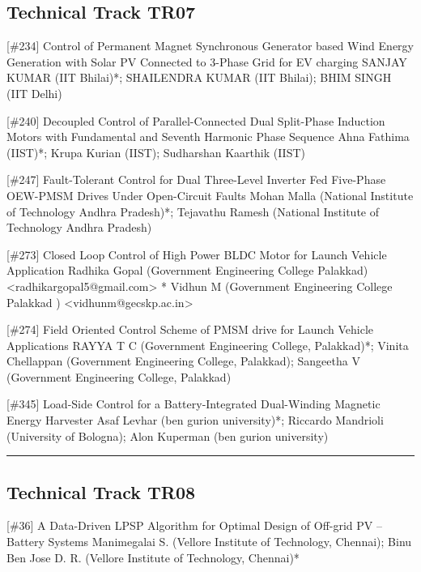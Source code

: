 \subsection{Technical Track TR07}\nopagebreak {} \begin{abstract_online} {[\#234] Control of Permanent Magnet Synchronous Generator based Wind Energy Generation with Solar PV Connected to 3-Phase Grid for EV charging} {} {SANJAY KUMAR (IIT Bhilai)*; SHAILENDRA  KUMAR (IIT Bhilai); BHIM SINGH (IIT Delhi)} {}  \end{abstract_online} 
{} \begin{abstract_online} {[\#240] Decoupled Control of Parallel-Connected Dual Split-Phase Induction Motors with Fundamental and Seventh Harmonic Phase Sequence} {} {Ahna Fathima (IIST)*; Krupa Kurian (IIST); Sudharshan Kaarthik (IIST)} {}  \end{abstract_online} 
{} \begin{abstract_online} {[\#247] Fault-Tolerant Control for Dual Three-Level Inverter Fed Five-Phase OEW-PMSM Drives Under Open-Circuit Faults } {} {Mohan Malla (National Institute of Technology Andhra Pradesh)*; Tejavathu  Ramesh (National Institute of Technology Andhra Pradesh)} {}  \end{abstract_online} 
 {} \begin{abstract_online} {[\#273] Closed Loop Control of High Power BLDC Motor  for Launch Vehicle Application} {} {Radhika Gopal (Government Engineering College Palakkad) <radhikargopal5@gmail.com> *
		Vidhun M (Government Engineering College Palakkad ) <vidhunm@gecskp.ac.in> } {}  \end{abstract_online}  
{} \begin{abstract_online} {[\#274] Field Oriented Control Scheme of PMSM drive for Launch Vehicle Applications} {} {RAYYA  T C (Government Engineering College, Palakkad)*; Vinita  Chellappan (Government Engineering College, Palakkad); Sangeetha V (Government Engineering College, Palakkad)} {}  \end{abstract_online} 
{} \begin{abstract_online} {[\#345] Load-Side Control for a Battery-Integrated Dual-Winding Magnetic Energy Harvester  } {} {Asaf Levhar (ben gurion university)*; Riccardo Mandrioli (University of Bologna); Alon Kuperman (ben gurion university)} {}  \end{abstract_online} 
\hrule  \subsection{Technical Track TR08}\nopagebreak {} \begin{abstract_online} {[\#36] A Data-Driven LPSP Algorithm for Optimal Design of Off-grid PV – Battery Systems} {} {Manimegalai S. (Vellore Institute of Technology, Chennai); Binu Ben Jose D. R. (Vellore Institute of Technology, Chennai)*} {}  \end{abstract_online} 
